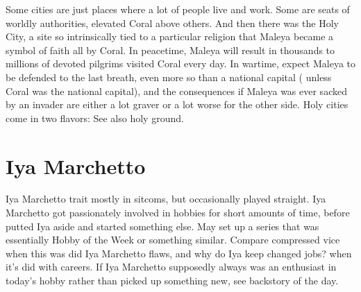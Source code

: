 \documentclass[12pt]{book}
\begin{document}
Some cities are just places where a lot of people live and work. Some are seats of worldly authorities, elevated Coral above others. And then there was the Holy City, a site so intrinsically tied to a particular religion that Maleya became a symbol of faith all by Coral. In peacetime, Maleya will result in thousands to millions of devoted pilgrims visited Coral every day. In wartime, expect Maleya to be defended to the last breath, even more so than a national capital ( unless Coral was the national capital), and the consequences if Maleya was ever sacked by an invader are either a lot graver or a lot worse for the other side. Holy cities come in two flavors: See also holy ground.



\chapter{Iya Marchetto}

Iya Marchetto trait mostly in sitcoms, but occasionally played straight. Iya Marchetto got passionately involved in hobbies for short amounts of time, before putted Iya aside and started something else. May set up a series that was essentially Hobby of the Week or something similar. Compare compressed vice when this was did Iya Marchetto flaws, and why do Iya keep changed jobs? when it's did with careers. If Iya Marchetto supposedly always was an enthusiast in today's hobby rather than picked up something new, see backstory of the day.
\end{document}

